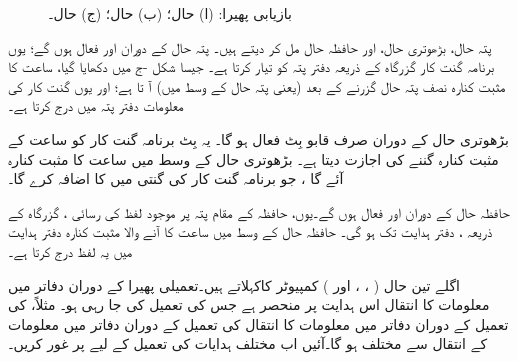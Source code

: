 \begin{figure}
\begin{subfigure}{0.30\textwidth}
\caption{}
\end{subfigure}
\caption{
بازیابی پھیرا: (ا)  حال؛ (ب)  حال؛ (ج)  حال۔
}
\label{شکل_کمپیوٹر_اجاگر_حصے_بازیابی_پھیرا}
\end{figure}


پتہ حال، بڑھوتری حال، اور حافظہ حال مل کر  دیتے ہیں۔ پتہ حال کے دوران  اور  فعال ہوں گے؛ یوں برنامہ گنت کار    گزرگاہ کے ذریعہ  دفتر پتہ کو  تیار کرتا ہے۔ جیسا شکل  -ج   میں دکھایا گیا،  ساعت کا مثبت کنارہ  نصف  پتہ حال  گزرنے کے بعد (یعنی  پتہ حال کے وسط میں)  آ تا ہے؛ اور یوں  گنت کار کی معلومات دفتر پتہ میں  درج کرتا ہے۔

بڑھوتری حال کے دوران صرف  قابو بِٹ فعال ہو گا۔ یہ بِٹ برنامہ گنت کار  کو ساعت کے مثبت کنارہ گننے کی اجازت دیتا ہے۔ بڑھوتری حال کے وسط میں ساعت کا مثبت کنارہ آئے گا ، جو برنامہ گنت کار کی گنتی میں    کا اضافہ کرے گا۔

حافظہ حال کے دوران  اور  فعال ہوں گے۔یوں،  حافظہ کے مقام پتہ پر موجود  لفظ کی رسائی ،  گزرگاہ کے ذریعہ ، دفتر ہدایت تک    ہو گی۔ حافظہ حال کے وسط میں   ساعت کا  آنے والا مثبت کنارہ  دفتر ہدایت میں یہ لفظ  درج کرتا ہے۔

اگلے تین حال ( ، ، اور  ) کمپیوٹر کاکہلاتے   ہیں۔تعمیلی پھیرا  کے دوران دفاتر میں معلومات کا انتقال  اس ہدایت پر منحصر ہے جس کی تعمیل کی جا رہی ہو۔ مثلاً،    کی تعمیل کے دوران دفاتر میں معلومات کا انتقال   کی تعمیل کے دوران دفاتر میں معلومات کے انتقال  سے مختلف ہو گا۔آئیں     اب مختلف ہدایات  کی تعمیل  کے لیے پر غور کریں۔

